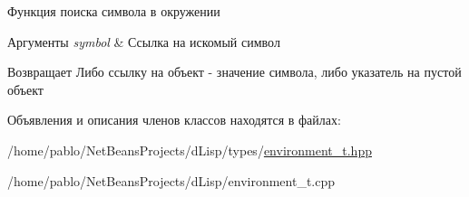Функция поиска символа в окружении 


\begin{DoxyParams}{Аргументы}
{\em symbol} & Ссылка на искомый символ \\
\hline
\end{DoxyParams}
\begin{DoxyReturn}{Возвращает}
Либо ссылку на объект -\/ значение символа, либо указатель на пустой объект 
\end{DoxyReturn}


Объявления и описания членов классов находятся в файлах\+:\begin{DoxyCompactItemize}
\item 
/home/pablo/\+Net\+Beans\+Projects/d\+Lisp/types/\mbox{\hyperlink{environment__t_8hpp}{environment\+\_\+t.\+hpp}}\item 
/home/pablo/\+Net\+Beans\+Projects/d\+Lisp/environment\+\_\+t.\+cpp\end{DoxyCompactItemize}
